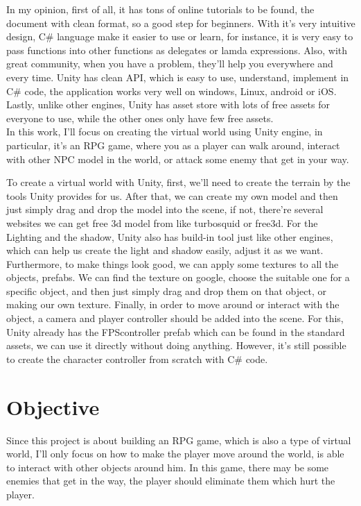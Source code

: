 \documentclass[a4paper, 13pt]{extarticle}
\begin{document}
 In my opinion, first of all, it has tons of online tutorials to be found, the document with clean format, so a good step for beginners. With it's very intuitive design, C\# language make it easier to use or learn, for instance, it is very easy to pass functions into other functions as delegates or lamda expressions. Also, with great community, when you have a problem, they'll help you everywhere and every time. Unity has clean API, which is easy to use, understand, implement in C\# code, the application works very well on windows, Linux, android or iOS. Lastly, unlike other engines, Unity has asset store with lots of free assets for everyone to use, while the other ones only have few free assets. \\[0.35cm]In this work, I'll focus on creating the virtual world using Unity engine, in particular, it's an RPG game, where you as a player can walk around, interact with other NPC model in the world, or attack some enemy that get in your way. 
  

 To create a virtual world with Unity, first, we'll need to create the terrain by the tools Unity provides for us. After that, we can create my own model and then just simply drag and drop the model into the scene, if not, there're several websites we can get free 3d model from like turbosquid or free3d. For the Lighting and the shadow, Unity also has build-in tool just like other engines, which can help us create the light and shadow easily, adjust it as we want. Furthermore, to make things look good, we can apply some textures to all the objects, prefabs. We can find the texture on google, choose the suitable one for a specific object, and then just simply drag and drop them on that object, or making our own texture. Finally, in order to move around or interact with the object, a camera and player controller should be added into the scene. For this, Unity already has the FPScontroller prefab which can be found in the standard assets, we can use it directly without doing anything. However, it's still possible to create the character controller from scratch with C\# code.
 \section{\Large Objective} 
 	Since this project is about building an RPG game, which is also a type of virtual world, I'll only focus on how to make the player move around the world, is able to interact with other objects around him. In this game, there may be some enemies that get in the way, the player should eliminate them which hurt the player. 
\end{document}
